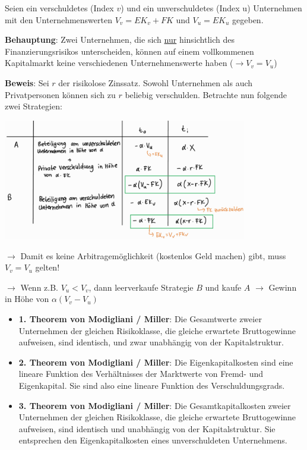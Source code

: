 Seien ein verschuldetes (Index $v$) und ein unverschuldetes (Index u) Unternehmen mit den Unternehmenswerten $V_v=EK_v+FK$ und $V_u=EK_u$ gegeben.

\textbf{Behauptung}: Zwei Unternehmen, die sich \underline{nur} hinsichtlich des Finanzierungsrisikos unterscheiden, können auf einem vollkommenen Kapitalmarkt keine verschiedenen Unternehmenswerte haben ($\rightarrow V_v=V_u$)

\textbf{Beweis}: Sei $r$ der risikolose Zinssatz. Sowohl Unternehmen als auch Privatpersonen können sich zu $r$ beliebig verschulden. Betrachte nun folgende zwei Strategien:
\begin{center}
	\includegraphics[width=0.8\textwidth]{images/mm.png}
\end{center}
$\rightarrow$ Damit es keine Arbitragemöglichkeit (kostenlos Geld machen) gibt, muss $V_v=V_u$ gelten!

$\rightarrow$ Wenn z.B. $V_u<V_v$, dann leerverkaufe Strategie $B$ und kaufe $A$ $\rightarrow$ Gewinn in Höhe von $\alpha (V_v-V_u)$

\begin{itemize}
	\item \textbf{1. Theorem von Modigliani / Miller}: Die Gesamtwerte zweier Unternehmen der gleichen Risikoklasse, die gleiche erwartete Bruttogewinne aufweisen, sind identisch, und zwar unabhängig von der Kapitalstruktur.
	\item \textbf{2. Theorem von Modigliani / Miller}: Die Eigenkapitalkosten sind eine lineare Funktion des Verhältnisses der Marktwerte von Fremd- und Eigenkapital. Sie sind also eine lineare Funktion des Verschuldungsgrads.
	\item \textbf{3. Theorem von Modigliani / Miller}: Die Gesamtkapitalkosten zweier Unternehmen der gleichen Risikoklasse, die gleiche erwartete Bruttogewinne aufweisen, sind identisch und unabhängig von der Kapitalstruktur. Sie entsprechen den Eigenkapitalkosten eines unverschuldeten Unternehmens.
\end{itemize}

